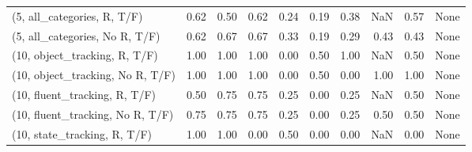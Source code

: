 \begin{table*}[h!]
\begin{adjustbox}{width=2\columnwidth,center}
\begin{tabular}{lrrr|rrr|rrr}
(5, all\_categories, R, T/F)          &                      0.62 &                  0.50 &                      0.62 &                          0.24 &                      0.19 &                          0.38 &                                    NaN &                               0.57 &                                  None \\
(5, all\_categories, No R, T/F)       &                      0.62 &                  0.67 &                      0.67 &                          0.33 &                      0.19 &                          0.29 &                                   0.43 &                               0.43 &                                  None \\



\midrule
(10, object\_tracking, R, T/F)         &                      1.00 &                  1.00 &                      1.00 &                          0.00 &                      0.50 &                          1.00 &                                    NaN &                               0.50 &                                  None \\
(10, object\_tracking, No R, T/F)      &                      1.00 &                  1.00 &                      1.00 &                          0.00 &                      0.50 &                          0.00 &                                   1.00 &                               1.00 &                                  None \\
(10, fluent\_tracking, R, T/F)         &                      0.50 &                  0.75 &                      0.75 &                          0.25 &                      0.00 &                          0.25 &                                    NaN &                               0.50 &                                  None \\
(10, fluent\_tracking, No R, T/F)      &                      0.75 &                  0.75 &                      0.75 &                          0.25 &                      0.00 &                          0.25 &                                   0.50 &                               0.50 &                                  None \\
(10, state\_tracking, R, T/F)          &                      1.00 &                  1.00 &                      0.00 &                          0.50 &                      0.00 &                          0.00 &                                    NaN &                               0.00 &                                  None \\

\end{tabular}
\end{adjustbox}
\end{table*}
